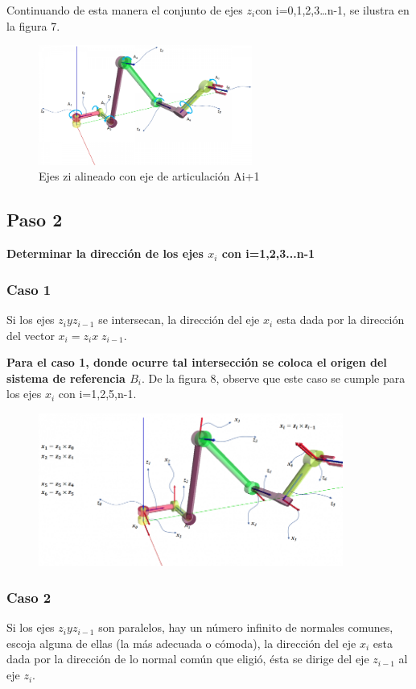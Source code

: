 \documentclass[12pt,a4paper]{report}
\begin{document}
Continuando de esta manera el conjunto de ejes $z_{i}$con i=0,1,2,3…n-1, se ilustra en la figura 7.
\begin{figure}[hbtp]
\centering
\includegraphics[width=7cm]{7.png}
\caption{Ejes zi alineado con eje de articulación Ai+1}
\end{figure}
\subsection{Paso 2}
\textbf{Determinar la dirección de los ejes $x_{i}$ con i=1,2,3...n-1}
\subsubsection{Caso 1}
Si los ejes $z_{i} y z_{i-1}$ se intersecan, la dirección del eje $x_{i}$ esta dada por la dirección del vector $x_{i}=z_{i}x \;z_{i-1}$.

\textbf{Para el caso 1, donde ocurre tal intersección se coloca el origen del sistema de referencia $B_{i}$}.
De la figura 8, observe que este caso se cumple para los ejes $x_{i}$ con i=1,2,5,n-1.
\begin{figure}[hbtp]
\centering
\includegraphics[width=10cm]{8.png}
\caption{}
\end{figure}
\subsubsection{Caso 2}
Si los ejes $z_{i} y z_{i-1}$ son paralelos, hay un número infinito de normales comunes,  escoja alguna de ellas (la más adecuada o cómoda), la dirección del eje $x_{i}$ esta dada por la dirección de lo normal común que eligió, ésta se dirige del eje $z_{i-1}$ al eje $z_{i}$.
\end{document}
